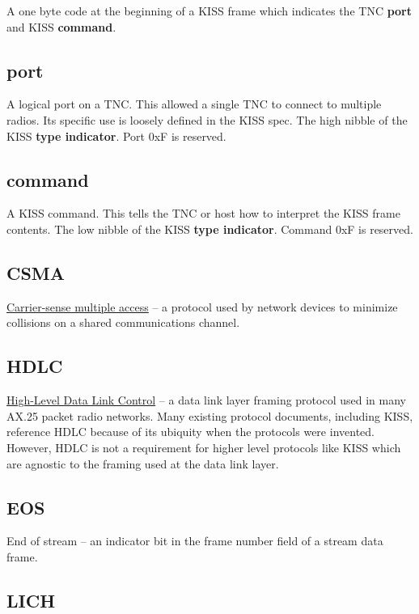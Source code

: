 \documentclass[a4paper,11pt,oneside]{article}
\begin{document}
A one byte code at the beginning of a KISS frame which indicates the TNC \textbf{port} and KISS \textbf{command}.

\subsection{port}

A logical port on a TNC. This allowed a single TNC to connect to multiple radios. Its specific use is loosely defined in the KISS spec. The high nibble of the KISS \textbf{type indicator}. Port 0xF is reserved.

\subsection{command}

A KISS command. This tells the TNC or host how to interpret the KISS frame contents. The low nibble of the KISS \textbf{type indicator}. Command 0xF is reserved.

\subsection{CSMA}

\href{https://en.wikipedia.org/wiki/Carrier-sense_multiple_access}{Carrier-sense multiple access} -- a protocol used by network devices to minimize collisions on a shared communications channel.

\subsection{HDLC}

\href{https://en.wikipedia.org/wiki/High-Level_Data_Link_Control}{High-Level Data Link Control} -- a data link layer framing protocol used in many AX.25 packet radio networks. Many existing protocol documents, including KISS, reference HDLC because of its ubiquity when the protocols were invented. However, HDLC is not a requirement for higher level protocols like KISS which are agnostic to the framing used at the data link layer.

\subsection{EOS}

End of stream -- an indicator bit in the frame number field of a stream data frame.

\subsection{LICH}
\end{document}
